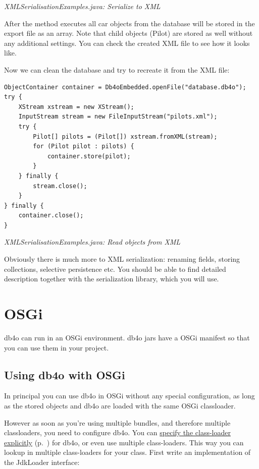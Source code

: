 {\small\itshape XMLSerialisationExamples.java: Serialize to XML\par}
\medskip

After the method executes all car objects from the database will be stored in the export file as an array. Note that child objects (Pilot) are stored as well without any additional settings. You can check the created XML file to see how it looks like.

Now we can clean the database and try to recreate it from the XML file:

\begin{lstlisting}
ObjectContainer container = Db4oEmbedded.openFile("database.db4o");
try {
    XStream xstream = new XStream();
    InputStream stream = new FileInputStream("pilots.xml");
    try {
        Pilot[] pilots = (Pilot[]) xstream.fromXML(stream);
        for (Pilot pilot : pilots) {
            container.store(pilot);
        }
    } finally {
        stream.close();
    }
} finally {
    container.close();
}
\end{lstlisting}

{\small\itshape XMLSerialisationExamples.java: Read objects from XML\par}
\medskip

Obviously there is much more to XML serialization: renaming fields, storing collections, selective persistence etc. You should be able to find detailed description together with the serialization library, which you will use.

\section{OSGi}
\label{ref:platform-specific-issues-database-for-osgi}

db4o can run in an OSGi environment. db4o jars have a OSGi manifest so that you can use them in your project.

\subsection*{Using db4o with OSGi}

In principal you can use db4o in OSGi without any special configuration, as long as the stored objects and db4o are loaded with the same OSGi classloader.

However as soon as you're using multiple bundles, and therefore multiple classloaders, you need to configure db4o. You can \hyperref[ref:configuration-common-reflector]{specify the class-loader explicitly} (p.~\pageref{ref:configuration-common-reflector}) for db4o, or even use multiple class-loaders. This way you can lookup in multiple class-loaders for your class. First write an implementation of the JdkLoader interface:

